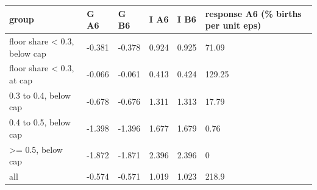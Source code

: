 \begingroup\small
\setlength{\tabcolsep}{3pt}
\renewcommand{\arraystretch}{1.04}
\begin{tabularx}{\linewidth}{XXXXXX}
\toprule
group & G A6 & G B6 & I A6 & I B6 & response A6 (\% births per unit eps) \\
\midrule
floor share \textless{} 0.3, below cap & -0.381 & -0.378 & 0.924 & 0.925 & 71.09 \\
floor share \textless{} 0.3, at cap & -0.066 & -0.061 & 0.413 & 0.424 & 129.25 \\
0.3 to 0.4, below cap & -0.678 & -0.676 & 1.311 & 1.313 & 17.79 \\
0.4 to 0.5, below cap & -1.398 & -1.396 & 1.677 & 1.679 & 0.76 \\
\textgreater{}= 0.5, below cap & -1.872 & -1.871 & 2.396 & 2.396 & 0 \\
all & -0.574 & -0.571 & 1.019 & 1.023 & 218.9 \\
\bottomrule
\end{tabularx}
\endgroup
